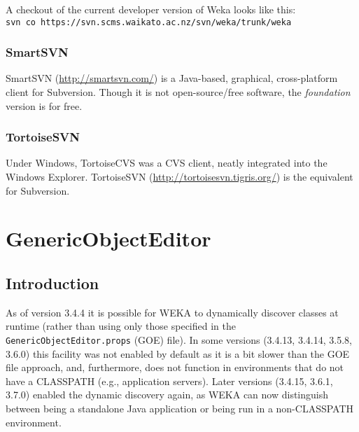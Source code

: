 \noindent A checkout of the current developer version of Weka looks like this:\\

\verb=svn co https://svn.scms.waikato.ac.nz/svn/weka/trunk/weka=

\subsubsection*{SmartSVN}
SmartSVN (\url{http://smartsvn.com/}{}) is a Java-based, graphical,
cross-platform client for Subversion. Though it is not
open-source/free software, the \textit{foundation} version is for free.

\subsubsection*{TortoiseSVN}
Under Windows, TortoiseCVS was a CVS client, neatly integrated into
the Windows Explorer. TortoiseSVN
(\url{http://tortoisesvn.tigris.org/}{}) is the equivalent for
Subversion.

\newpage

\section{GenericObjectEditor}

\subsection{Introduction}
As of version 3.4.4 it is possible for WEKA to dynamically discover
classes at runtime (rather than using only those specified in the
\verb=GenericObjectEditor.props= (GOE) file). In some versions (3.4.13, 3.4.14,
3.5.8, 3.6.0) this facility was not enabled by default as it is a bit slower
than the GOE file approach, and, furthermore, does not function in
environments that do not have a CLASSPATH (e.g., application servers). Later
versions (3.4.15, 3.6.1, 3.7.0) enabled the dynamic discovery again, as WEKA can
now distinguish between being a standalone Java application or being run in a
non-CLASSPATH environment.

